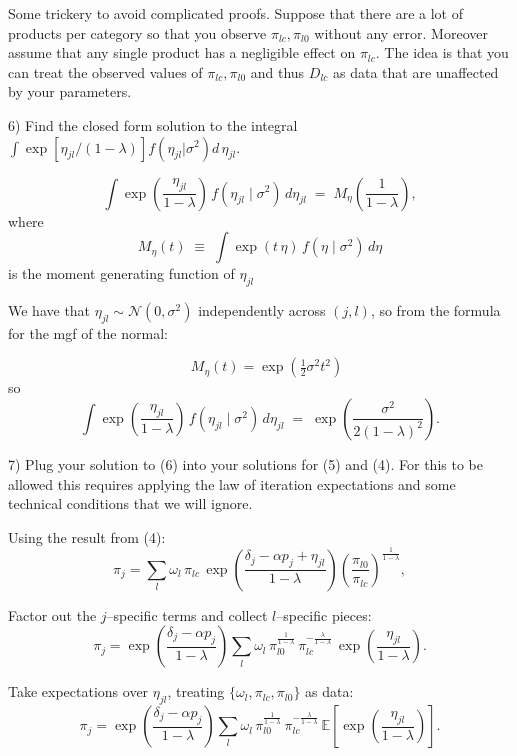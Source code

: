 \documentclass{article}
\begin{document}
\begin{tcolorbox}
Some trickery to avoid complicated proofs. Suppose that there are a lot of products per category so that you observe $\pi_{lc}, \pi_{l0}$ without any error. Moreover assume that any single product has a negligible effect on $\pi_{lc}$. The idea is that you can treat the observed values of $\pi_{lc}, \pi_{l0}$ and thus $D_{lc}$ as data that are unaffected by your parameters.
\end{tcolorbox}

\begin{tcolorbox}
6) Find the closed form solution to the integral $\int \exp[\eta_{jl}/(1-\lambda)] f(\eta_{jl} | \sigma^2) d\, \eta_{jl}$.
\end{tcolorbox}

\[
\int \exp\!\left(\frac{\eta_{jl}}{1-\lambda}\right)\, f(\eta_{jl}\mid \sigma^2)\, d\eta_{jl}
\;=\;
M_{\eta}\!\left(\frac{1}{1-\lambda}\right),
\]
where
\[
M_{\eta}(t) \;\equiv\; \int \exp(t\,\eta)\, f(\eta\mid \sigma^2)\, d\eta
\]
is the moment generating function of \(\eta_{jl}\)

\vspace{5mm}

We have that $\eta_{jl} \sim \mathcal{N}(0,\sigma^2)$ independently across $(j,l)$, so from the formula for the mgf of the normal:

\[
\quad M_{\eta}(t)=\exp\!\left(\tfrac{1}{2}\sigma^2 t^2\right)
\]
so
\[
\int \exp\!\left(\frac{\eta_{jl}}{1-\lambda}\right)\, f(\eta_{jl}\mid \sigma^2)\, d\eta_{jl}
\;=\;
\exp\!\left(\frac{\sigma^{2}}{2(1-\lambda)^{2}}\right).
\]


\begin{tcolorbox}
7) Plug your solution to (6) into your solutions for (5) and (4). For this to be allowed this requires applying the law of iteration expectations and some technical conditions that we will ignore.
\end{tcolorbox}

Using the result from (4):
\[
\pi_j
=\sum_{l}\omega_l\,\pi_{lc}\,
\exp\!\left(\frac{\delta_j-\alpha p_j+\eta_{jl}}{1-\lambda}\right)
\left(\frac{\pi_{l0}}{\pi_{lc}}\right)^{\!\frac{1}{1-\lambda}},
\]

Factor out the $j$–specific terms and collect $l$–specific pieces:
\[
\pi_j
=\exp\!\left(\frac{\delta_j-\alpha p_j}{1-\lambda}\right)
\sum_{l}\omega_l\,
\pi_{l0}^{\frac{1}{1-\lambda}}\,
\pi_{lc}^{-\frac{\lambda}{1-\lambda}}\,
\exp\!\left(\frac{\eta_{jl}}{1-\lambda}\right).
\]

Take expectations over $\eta_{jl}$, treating
$\{\omega_l,\pi_{lc},\pi_{l0}\}$ as data:
\[
\pi_j
=\exp\!\left(\frac{\delta_j-\alpha p_j}{1-\lambda}\right)
\sum_{l}\omega_l\,
\pi_{l0}^{\frac{1}{1-\lambda}}\,
\pi_{lc}^{-\frac{\lambda}{1-\lambda}}\,
\mathbb{E}\!\left[\exp\!\left(\frac{\eta_{jl}}{1-\lambda}\right)\right].
\]
\end{document}
